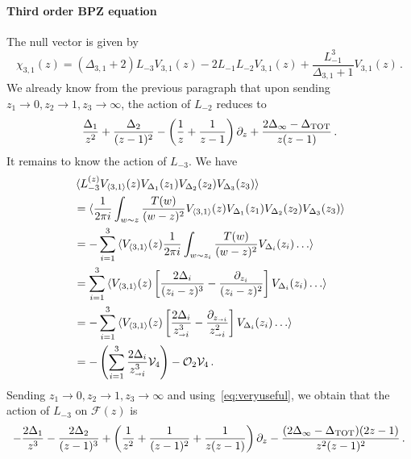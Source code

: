\documentclass[a4paper]{article}
\begin{document}
\paragraph{Third order BPZ equation}
The null vector is given by 
\begin{equation}\label{eq:decoupling3}
  \chi_{3,1}(z)=(\Delta_{3,1}+2)L_{-3} V_{3,1}(z) -2 L_{-1} L_{-2}V_{3,1}(z)+\frac{L_{-1}^3}{\Delta_{3,1}+1}V_{3,1}(z)\,.
\end{equation}
We already know from the previous paragraph that upon sending $z_1 \to 0, z_2 \to 1, z_{3}\to \infty$, the action of $L_{-2}$ reduces to
\begin{equation}\label{eq:l-2}
  \frac{\Delta_1}{z^2}+\frac{\Delta_2}{(z-1)^2}-\left(\frac{1}{z}+\frac{1}{z-1}\right)\partial_z +\frac{2\Delta_{\infty}-\Delta_{\rm TOT}}{z(z-1)}\,.
\end{equation}
It remains to know the action of $L_{-3}$. We have
\begin{equation}
  \begin{aligned}
    &\braket{L_{-3}^{(z)}V_{\braket{3,1}}(z)V_{\Delta_1}(z_1)V_{\Delta_2}(z_2)V_{\Delta_3}(z_3)}\\
    &=\braket{\frac{1}{2\pi i}\int _{w \sim z} \frac{T(w)}{(w-z)^2}V_{\braket{3,1}}(z)V_{\Delta_1}(z_1)V_{\Delta_2}(z_2)V_{\Delta_3}(z_3)}\\
    &=-\sum_{i=1}^3 \braket{V_{\braket{3,1}}(z) \frac{1}{2\pi i}\int _{w \sim z_i} \frac{T(w)}{(w-z)^2}V_{\Delta_i}(z_i) \dots}\\
    &=\sum_{i=1}^3 \braket{V_{\braket{3,1}}(z) \left[\frac{2\Delta_i}{(z_i-z)^3}-\frac{\partial_{z_i}}{(z_i-z)^2}\right]V_{\Delta_i}(z_i) \dots}\\
    &=-\sum_{i=1}^3 \braket{V_{\braket{3,1}}(z) \left[\frac{2\Delta_i}{z_{\shortrightarrow i}^3}-\frac{\partial_{z_{\shortrightarrow i}}}{z_{\shortrightarrow i}^2}\right]V_{\Delta_i}(z_i) \dots}\\
    &=-\left(\sum_{i=1}^3 \frac{2\Delta_i}{z_{\shortrightarrow i}^3}\mathcal{V}_{4}\right)-\mathcal{O}_{2} \mathcal{V}_{4}\,.
  \end{aligned}
\end{equation}
Sending $z_1 \to 0, z_2 \to 1, z_{3}\to \infty$ and using~\eqref{eq:veryuseful}, we obtain that the action of $L_{-3}$ on $\mathcal{F}(z)$ is
\begin{equation}\label{eq:l-3}
  -\frac{2\Delta_1}{z^3}-\frac{2\Delta_2}{(z-1)^3}+\left(\frac{1}{z^2}+\frac{1}{(z-1)^2}+\frac{1}{z(z-1)}\right)\partial_z -\frac{(2\Delta_{\infty}-\Delta_{\rm TOT})(2z-1)}{z^2(z-1)^2}\,.
\end{equation}
\end{document}
